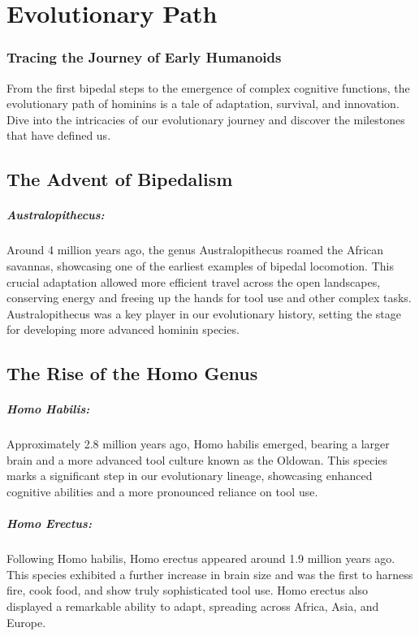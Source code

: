 \documentclass[a4paper,12pt]{book}
\begin{document}
\chapter{Evolutionary Path}
\subsection*{Tracing the Journey of Early Humanoids}

From the first bipedal steps to the emergence of complex cognitive functions, the evolutionary path of hominins is a tale of adaptation, survival, and innovation. Dive into the intricacies of our evolutionary journey and discover the milestones that have defined us.

\section*{The Advent of Bipedalism}

\paragraph{Australopithecus:}
Around 4 million years ago, the genus Australopithecus roamed the African savannas, showcasing one of the earliest examples of bipedal locomotion. This crucial adaptation allowed more efficient travel across the open landscapes, conserving energy and freeing up the hands for tool use and other complex tasks. Australopithecus was a key player in our evolutionary history, setting the stage for developing more advanced hominin species.

\section*{The Rise of the Homo Genus}

\paragraph{Homo Habilis:}
Approximately 2.8 million years ago, Homo habilis emerged, bearing a larger brain and a more advanced tool culture known as the Oldowan. This species marks a significant step in our evolutionary lineage, showcasing enhanced cognitive abilities and a more pronounced reliance on tool use.

\paragraph{Homo Erectus:}
Following Homo habilis, Homo erectus appeared around 1.9 million years ago. This species exhibited a further increase in brain size and was the first to harness fire, cook food, and show truly sophisticated tool use. Homo erectus also displayed a remarkable ability to adapt, spreading across Africa, Asia, and Europe.
\end{document}
